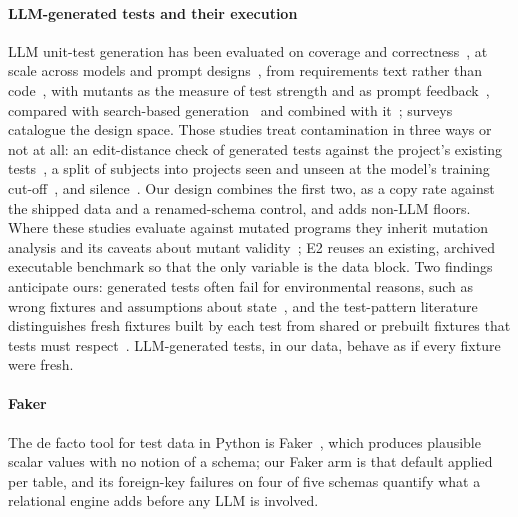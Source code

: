 \documentclass[preprint,12pt]{elsarticle}
\begin{document}
\paragraph{LLM-generated tests and their execution} LLM unit-test generation has been evaluated on coverage and correctness~\cite{schafer2024testpilot,siddiq2024junit,yuan2024chattester,chen2024chatunitest}, at scale across models and prompt designs~\cite{ouedraogo2026emse,walczak2026jss}, from requirements text rather than code~\cite{alagarsamy2025jss}, with mutants as the measure of test strength and as prompt feedback~\cite{dakhel2024mutap}, compared with search-based generation~\cite{tang2024chatgptsbst} and combined with it~\cite{lemieux2023codamosa}; surveys~\cite{wang2024survey} catalogue the design space. Those studies treat contamination in three ways or not at all: an edit-distance check of generated tests against the project's existing tests~\cite{schafer2024testpilot,yuan2024chattester}, a split of subjects into projects seen and unseen at the model's training cut-off~\cite{chen2024chatunitest}, and silence~\cite{dakhel2024mutap}. Our design combines the first two, as a copy rate against the shipped data and a renamed-schema control, and adds non-LLM floors. Where these studies evaluate against mutated programs they inherit mutation analysis and its caveats about mutant validity~\cite{just2014mutants,papadakis2019mutation}; E2 reuses an existing, archived executable benchmark so that the only variable is the data block. Two findings anticipate ours: generated tests often fail for environmental reasons, such as wrong fixtures and assumptions about state~\cite{schafer2024testpilot,yuan2024chattester}, and the test-pattern literature distinguishes fresh fixtures built by each test from shared or prebuilt fixtures that tests must respect~\cite{meszaros2007xunit}. LLM-generated tests, in our data, behave as if every fixture were fresh.

\paragraph{Faker} The de facto tool for test data in Python is Faker~\cite{faker}, which produces plausible scalar values with no notion of a schema; our Faker arm is that default applied per table, and its foreign-key failures on four of five schemas quantify what a relational engine adds before any LLM is involved.
\end{document}
